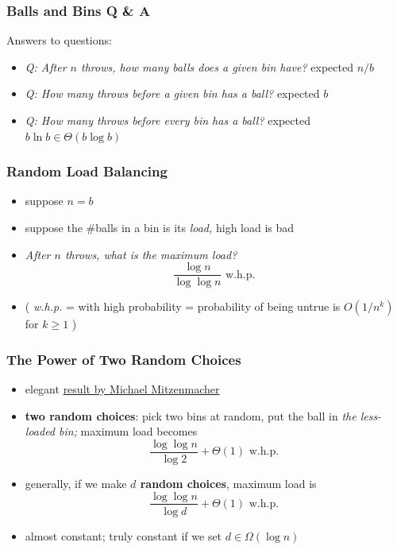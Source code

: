 \documentclass[10pt]{beamer}
\begin{document}
\begin{frame} \frametitle{Balls and Bins Q \& A}
Answers to questions:
\begin{itemize}
  \item \emph{Q: After $n$ throws, how many balls does a given bin have?} expected $n/b$
  \item \emph{Q: How many throws before a given bin has a ball?} expected $b$
  \item \emph{Q: How many throws before every bin has a ball?} expected $b \ln b \in \Theta(b \log b)$
\end{itemize}
\end{frame}

\begin{frame} \frametitle{Random Load Balancing}
\begin{itemize}
  \item suppose $n=b$
  \item suppose the \#balls in a bin is its \emph{load,} high load is bad
  \item \emph{After $n$ throws, what is the maximum load?}
    \[ \frac{\log n}{\log \log n} \text{ w.h.p. } \]
  \item ( \emph{w.h.p.} = with high probability = probability of being untrue is $O(1/n^k)$ for $k \geq 1$ )
\end{itemize}
\end{frame}

\begin{frame} \frametitle{The Power of Two Random Choices}
\begin{itemize}
  \item elegant \href{https://www.eecs.harvard.edu/~michaelm/postscripts/handbook2001.pdf}{result by Michael Mitzenmacher}
  \item \textbf{two random choices}: pick two bins at random, put the ball in
    \emph{the less-loaded bin;} maximum load becomes
    \[ \frac{\log \log n}{\log 2} + \Theta(1) \text{ w.h.p. } \]
  \item generally, if we make \textbf{$d$ random choices}, maximum load is
    \[ \frac{\log \log n}{\log d} + \Theta(1) \text { w.h.p. } \]
  \item almost constant; truly constant if we set $d \in \Omega(\log n)$
\end{itemize}
\end{frame}
\end{document}
